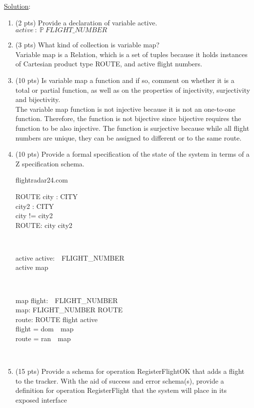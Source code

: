 \documentclass[12pt]{article}
\begin{document}
\noindent \underline{Solution}:
\begin{enumerate}
	\item (2 pts) Provide a declaration of variable active.\\
	      $active~:~\mathbb{P}~FLIGHT\_NUMBER$
	\item (3 pts) What kind of collection is variable map?\\
	      \noindent Variable map is a Relation, which is a set of tuples because it holds instances of Cartesian product type ROUTE, and active flight numbers.
	\item (10 pts) Is variable map a function and if so, comment on whether it is a total or
	      partial function, as well as on the properties of injectivity, surjectivity and bijectivity.\\
	      The variable map function is not injective because it is not an one-to-one function.
	      Therefore, the function is not bijective since bijective requires the function to be also injective.
	      The function is surjective because while all flight numbers are unique, they can be assigned to different or to the same route.
	\item (10 pts) Provide a formal specification of the state of the system in terms of a Z specification schema.
	      \begin{class}{flightradar24.com}
		      \begin{schema}{ROUTE}
			      city : CITY\\
				  city2 : CITY\\
			      \where
				  city != city2\\
				  ROUTE: city \times city2
		      \end{schema}\\
		      \begin{schema}{active}
			      active:~~FLIGHT\_NUMBER \\
			      \where
			      active \in map\\
		      \end{schema}\\
		      \begin{schema}{map}
				  flight:~~FLIGHT\_NUMBER \\
				  map: FLIGHT\_NUMBER \nrightarrow ROUTE\\
				  route: ROUTE 
			      \where
				  flight \in active\\
				  flight = dom\ \ map\\
			      route = ran\ \ map\\
		      \end{schema}\\
	      \end{class}
	      \newpage
	\item (15 pts) Provide a schema for operation RegisterFlightOK that adds a flight to the
	      tracker. With the aid of success and error schema(s), provide a definition for operation
	      RegisterFlight that the system will place in its exposed interface


\end{enumerate}
\end{document}
